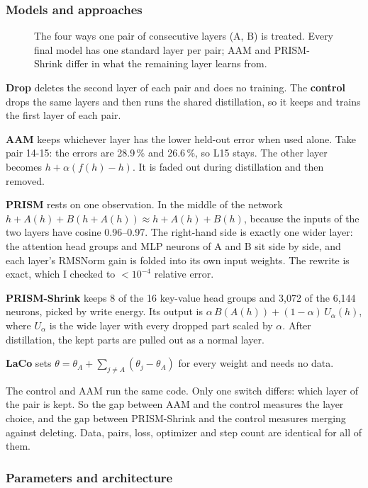 \documentclass[11pt]{article}
\begin{document}
\subsubsection{Models and approaches}

\begin{figure}[t]
\centering

\caption{The four ways one pair of consecutive layers (A, B) is treated. Every final model has one standard layer per
pair; AAM and PRISM-Shrink differ in what the remaining layer learns from.}
\label{fig:methods}
\end{figure}

\textbf{Drop} deletes the second layer of each pair and does no training. The \textbf{control} drops the same
layers and then runs the shared distillation, so it keeps and trains the first layer of each pair.

\textbf{AAM} keeps whichever layer has the lower held-out error when used alone. Take pair 14-15: the errors are
28.9\,\% and 26.6\,\%, so L15 stays. The other layer becomes $h + \alpha(f(h)-h)$. It is faded out during
distillation and then removed.

\textbf{PRISM} rests on one observation. In the middle of the network
$h + A(h) + B(h + A(h)) \approx h + A(h) + B(h)$, because the inputs of the two layers have cosine 0.96--0.97. The
right-hand side is exactly one wider layer: the attention head groups and MLP neurons of A and B sit side by side,
and each layer's RMSNorm gain is folded into its own input weights. The rewrite is exact, which I checked to
$<10^{-4}$ relative error.

\textbf{PRISM-Shrink} keeps 8 of the 16 key-value head groups and 3{,}072 of the 6{,}144 neurons, picked by write
energy. Its output is $\alpha\,B(A(h)) + (1-\alpha)\,U_\alpha(h)$, where $U_\alpha$ is the wide layer with every
dropped part scaled by $\alpha$. After distillation, the kept parts are pulled out as a normal layer.

\textbf{LaCo} sets $\theta = \theta_A + \sum_{j\neq A}(\theta_j - \theta_A)$ for every weight and needs no data.

The control and AAM run the same code. Only one switch differs: which layer of the pair is kept. So the gap between
AAM and the control measures the layer choice, and the gap between PRISM-Shrink and the control measures merging
against deleting. Data, pairs, loss, optimizer and step count are identical for all of them.

\subsubsection{Parameters and architecture}
\end{document}
